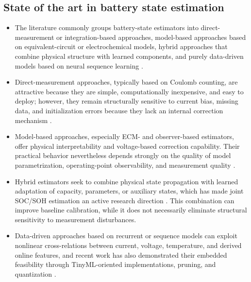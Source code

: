 \documentclass[review]{elsarticle}
\begin{document}
\subsection{State of the art in battery state estimation}
\begin{itemize}[leftmargin=*]
    \item The literature commonly groups battery-state estimators into direct-measurement or integration-based approaches, model-based approaches based on equivalent-circuit or electrochemical models, hybrid approaches that combine physical structure with learned components, and purely data-driven models based on neural sequence learning \cite{khanComparativeStudyDifferent2022,shrivastavaReviewTechnologicalAdvancement2023,guoSystematicReviewElectrochemical2024,yaoSmarterBatteryManagement2025b}.
    \item Direct-measurement approaches, typically based on Coulomb counting, are attractive because they are simple, computationally inexpensive, and easy to deploy; however, they remain structurally sensitive to current bias, missing data, and initialization errors because they lack an internal correction mechanism \cite{khanComparativeStudyDifferent2022,liRobustnessSOCEstimation2015}.
    \item Model-based approaches, especially ECM- and observer-based estimators, offer physical interpretability and voltage-based correction capability. Their practical behavior nevertheless depends strongly on the quality of model parametrization, operating-point observability, and measurement quality \cite{gaoEnhancedStateofchargeEstimation2022,guoSystematicReviewElectrochemical2024,liRobustnessSOCEstimation2015}.
    \item Hybrid estimators seek to combine physical state propagation with learned adaptation of capacity, parameters, or auxiliary states, which has made joint SOC/SOH estimation an active research direction \cite{gaoCoEstimationStateofChargeStateof2022,shenAlternativeCombinedCoestimation2022,wangFusionEstimationLithiumion2022}. This combination can improve baseline calibration, while it does not necessarily eliminate structural sensitivity to measurement disturbances.
    \item Data-driven approaches based on recurrent or sequence models can exploit nonlinear cross-relations between current, voltage, temperature, and derived online features, and recent work has also demonstrated their embedded feasibility through TinyML-oriented implementations, pruning, and quantization \cite{mondalEstimatingStateofChargeLithiumIon2024,Embedded_AI_only_SOC_mobile,giazitzisCaseStudyTiny2024,mazziStateChargeEstimation2022,yaoSmarterBatteryManagement2025b}.
\end{itemize}
\end{document}
